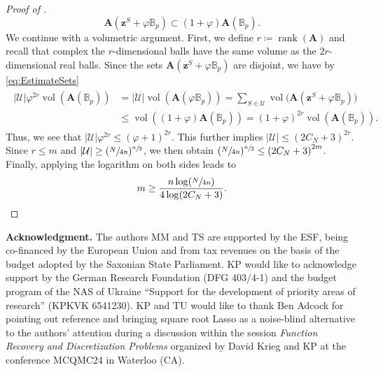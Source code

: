 \documentclass[11pt,reqno, a4paper]{article}
\numberwithin{equation}{section}
\begin{document}
\begin{proof}[Proof of ]
\begin{equation}\label{eq:EstimateSets}
    \mathbf{A}(\mathbf{z}^S+\varphi\mathbb{B}_{p})\subset\left(1+\varphi\right)\mathbf{A}(\mathbb{B}_{p}).
\end{equation}
We continue with a volumetric argument. First, we define $r\coloneqq\operatorname*{rank}(\mathbf{A})$ and recall that complex the $r$-dimensional balls have the same volume as the $2r$-dimensional real balls. Since the sets $\mathbf{A}(\mathbf{z}^S+\varphi\mathbb{B}_{p})$ are disjoint, we have by \eqref{eq:EstimateSets}
\begin{align}
\begin{split}
\lvert\mathcal{U}\rvert\varphi^{2r}\operatorname*{vol}(\mathbf{A}(\mathbb{B}_{p}))&=\lvert\mathcal{U}\rvert \operatorname*{vol}(\mathbf{A}(\varphi \mathbb{B}_{p}))=\sum\limits_{S\in\mathcal{U}}\operatorname*{vol}\bigl(\mathbf{A}(\mathbf{z}^S+\varphi\mathbb{B}_{p})\bigr)\\
&\leq\operatorname*{vol}\left(\left(1+\varphi\right)\mathbf{A}(\mathbb{B}_{p})\right)=\left(1+\varphi\right)^{2r}\operatorname*{vol}(\mathbf{A}(\mathbb{B}_{p})).
\end{split}
\end{align}
Thus, we see that $\lvert\mathcal{U}\rvert\varphi^{2r}\leq\left(\varphi+1\right)^{2r}$.
This further implies $\lvert\mathcal{U}\rvert \leq (2C_N+3)^{2r}$.
Since $r\leq m$ and $\lvert\mathcal{U}\rvert\geq(\sfrac{N}{4n})^{\sfrac{n}{2}}$, we then obtain $(\sfrac{N}{4n})^{\sfrac{n}{2}} \leq\left(2C_N+3\right)^{2m}$.
Finally, applying the logarithm on both sides leads to
\begin{gather}
    m\geq\frac{n\log(\sfrac{N}{4n})}{4\log(2C_N+3)}.
\end{gather}
\end{proof}



\noindent\textbf{Acknowledgment.} The authors MM and TS are supported by the ESF, being co-financed by the European Union and from tax revenues on the basis of the budget adopted by the Saxonian State Parliament. KP would like to acknowledge support by the German Research Foundation (DFG 403/4-1) and the budget program
of the NAS of Ukraine ``Support for the development of priority areas
of research'' (KPKVK 6541230). KP and TU would like to thank Ben Adcock for pointing out reference \cite{AdcockBrugWebster22,BDJR21} and bringing square root Lasso as a noise-blind alternative to the authors' attention during a discussion within the session {\em Function Recovery and Discretization Problems} organized by David Krieg and KP at the conference MCQMC24 in Waterloo (CA). 
\end{document}
